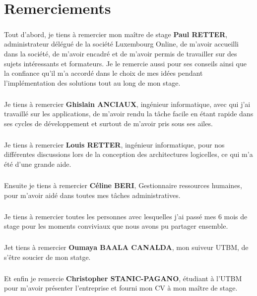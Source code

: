 \chapter*{Remerciements}
\paragraph*{}
Tout d'abord, je tiens à remercier mon maître de stage \textbf{Paul RETTER}, administrateur délégué de la société Luxembourg Online, de m'avoir accueilli dans la société, de m'avoir encadré et de m'avoir permis de travailler sur des sujets intéressants et formateurs. Je le remercie aussi pour ses conseils ainsi que la confiance qu'il m'a accordé dans le choix de mes idées pendant l'implémentation des solutions tout au long de mon stage.
\paragraph*{}
Je tiens à remercier \textbf{Ghislain ANCIAUX}, ingénieur informatique, avec qui j'ai travaillé sur les applications, de m'avoir rendu la tâche facile en étant rapide dans ses cycles de développement et surtout de m'avoir pris sous ses ailes.
\paragraph*{}
Je tiens à remercier \textbf{Louis RETTER}, ingénieur informatique, pour nos différentes discussions lors de la conception des architectures logicelles, ce qui m'a été d'une grande aide.
\paragraph*{}
Ensuite je tiens à remercier \textbf{Céline BERI}, Gestionnaire ressources humaines, pour m'avoir aidé dans toutes mes tâches administratives.
\paragraph*{}
Je tiens à remercier toutes les personnes avec lesquelles j'ai passé mes 6 mois de stage pour les moments conviviaux que nous avons pu partager ensemble.
\paragraph*{}
Jet tiens à remercier \textbf{Oumaya BAALA CANALDA}, mon suiveur UTBM, de s'être soucier de mon statge.
\paragraph*{}
Et enfin je remercie \textbf{Christopher STANIC-PAGANO}, étudiant à l'UTBM pour m'avoir présenter l'entreprise et fourni mon CV à mon maître de stage.

\tableofcontents{}
\listoffigures{}